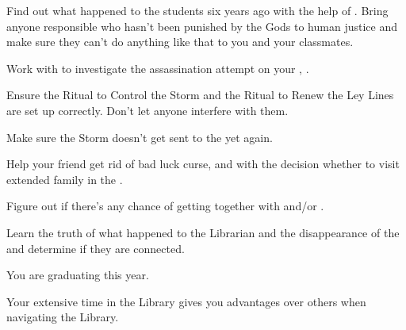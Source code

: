 \documentclass[char]{GL2020}
\begin{document}
\begin{itemz}
    \item Find out what happened to the students six years ago with the help of \cHeir{}. Bring anyone responsible who hasn't been punished by the Gods to human justice and make sure they can't do anything like that to you and your classmates.
    \item Work with \cJuniorStatesman{} to investigate the assassination attempt on your \cHeadDiplomat{\auncle}, \cHeadDiplomat{}.
    \item Ensure the Ritual to Control the Storm and the Ritual to Renew the Ley Lines are set up correctly. Don't let anyone interfere with them.  
    \item Make sure the Storm doesn't get sent to the \pShip{} yet again.
    \item Help your friend \cInitiate{} get rid of \cInitiate{\their} bad luck curse, and with the decision whether to visit \cInitiate{\their} extended family in the \pFarm{}.
    \item Figure out if there's any chance of getting together with \cHeir{} and/or \cChupStudent{}.
    \item Learn the truth of what happened to the Librarian and the disappearance of the \iScythe{} and determine if they are connected.
\end{itemz}

\begin{itemz}[Notes]
    \item You are graduating this year.
    \item Your extensive time in the Library gives you advantages over others when navigating the Library.
\end{itemz}
\end{document}
